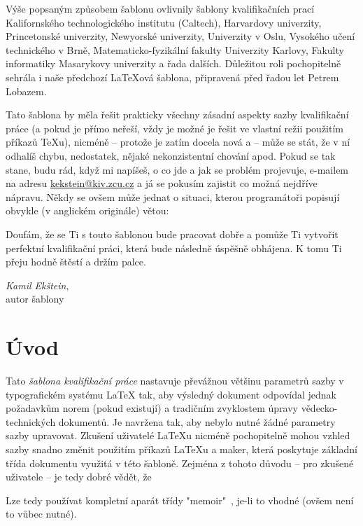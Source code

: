 \documentclass[czech, bc, kiv, he, iso690alph]{fasthesis}
\begin{document}
Výše popsaným způsobem šablonu ovlivnily šablony kvalifikačních prací Kalifornského technologického institutu (Caltech), Harvardovy univerzity, Princetonské univerzity, Newyorské univerzity, Univerzity v Oslu, Vysokého učení technického v Brně, Matematicko-fyzikální fakulty Univerzity Karlovy, Fakulty informatiky Masarykovy univerzity a řada dalších. Důležitou roli pochopitelně sehrála i naše předchozí \LaTeX{}ová šablona, připravená před řadou let Petrem Lobazem.

Tato šablona by měla řešit prakticky všechny zásadní aspekty sazby kvalifikační práce (a pokud je přímo neřeší, vždy je možné je řešit ve vlastní režii použitím příkazů \TeX{}u), nicméně -- protože je zatím docela nová a  -- může se stát, že v ní odhalíš chybu, nedostatek, nějaké nekonzistentní chování apod. Pokud se tak stane, budu rád, když mi napíšeš, o co jde a jak se problém projevuje, e-mailem na adresu \url{kekstein@kiv.zcu.cz} a já se pokusím zajistit co možná nejdříve nápravu. Někdy se ovšem může jednat o situaci, kterou programátoři popisují obvykle (v anglickém originále) větou: 

Doufám, že se Ti s touto šablonou bude pracovat dobře a pomůže Ti vytvořit perfektní kvalifikační práci, která bude následně úspěšně obhájena. K tomu Ti přeju hodně štěstí a držím palce.

\begin{flushright}
\textit{Kamil Ekštein},\\
autor šablony
\end{flushright}
%
%
%
%
\chapter{Úvod}
Tato \emph{šablona kvalifikační práce} nastavuje převážnou většinu parametrů sazby v typografickém systému \LaTeX{} tak, aby výsledný dokument odpovídal jednak požadavkům norem (pokud existují) a tradičním zvyklostem úpravy vědecko-technických dokumentů. Je navržena tak, aby nebylo nutné žádné parametry sazby  upravovat. Zkušení uživatelé \LaTeX{}u nicméně pochopitelně mohou vzhled sazby snadno změnit použitím příkazů \LaTeX{}u a maker, která poskytuje základní třída dokumentu využitá v této šabloně. Zejména z tohoto důvodu -- pro zkušené uživatele -- je tedy dobré vědět, že
\begin{center}
\end{center}
Lze tedy používat kompletní aparát třídy \filename"memoir"~\cite{memoir}, je-li to vhodné (ovšem není to vůbec nutné).
\end{document}
